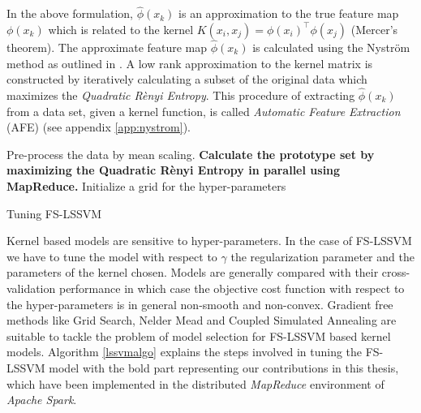 In the above formulation, $\hat{\phi}(x_k)$ is an approximation to the true feature map $\phi(x_k)$ which is related to the kernel $K(x_i, x_j) = \phi(x_i)^{\intercal} \phi(x_j)$ (Mercer's theorem). The approximate feature map $\hat{\phi}(x_k)$ is calculated using the Nystr\"om method as outlined in \cite{DeBrabanter2010, Mall2015, Mall2013}. A low rank approximation to the kernel matrix is constructed by iteratively calculating a subset of the original data which maximizes the \textit{Quadratic R\`enyi Entropy}. This procedure of extracting $\hat{\phi}(x_k)$ from a data set, given a kernel function, is called \textit{Automatic Feature Extraction} (AFE) (see appendix \ref{app:nystrom}).

\begin{algorithm}[!ht] \label{lssvmalgo}
\SetAlgoLined
{}
 Pre-process the data by mean scaling.\;
 \textbf{Calculate the prototype set by maximizing the Quadratic R\`enyi Entropy in parallel using MapReduce.}\;
 Initialize a grid for the hyper-parameters\;
 \caption{Tuning FS-LSSVM}
\end{algorithm}

Kernel based models are sensitive to hyper-parameters. In the case of FS-LSSVM we have to tune the model with respect to $\gamma$ the regularization parameter and the parameters of the kernel chosen. Models are generally compared with their cross-validation performance in which case the objective cost function with respect to the hyper-parameters is in general non-smooth and non-convex. Gradient free methods like Grid Search, Nelder Mead \cite{Nelder1965} and Coupled Simulated Annealing \cite{Xavier-De-Souza2010} are suitable to tackle the problem of model selection for FS-LSSVM based kernel models. Algorithm \ref{lssvmalgo} explains the steps involved in tuning the FS-LSSVM model with the bold part representing our contributions in this thesis, which have been implemented in the distributed \emph{MapReduce} environment of \emph{Apache Spark}.
